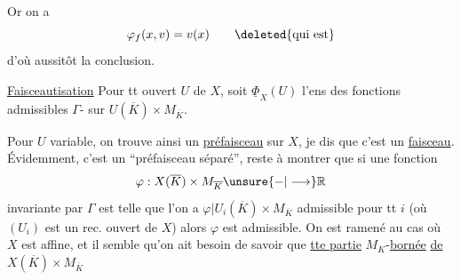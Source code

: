 Or on a
\[
\varphi_f(x,v)=v(x)\qquad\deleted{\text{qui est}}
\]
d'où aussitôt la conclusion.

\uline{Faisceautisation} Pour tt ouvert $U$ de $X$, soit $\underline{\Phi}_X(U)$ l'ens des fonctions admissibles $\Gamma$- sur $U(\overline K)\times M_{\overline K}$.

Pour $U$ variable, on trouve ainsi un \uline{préfaisceau}  sur $X$, je dis que c'est un \uline{faisceau}. Évidemment, c'est un ``préfaisceau séparé'', reste à montrer que si une fonction
\[
\varphi:X(\overline K)\times M_{\overline K}\unsure{-|\longrightarrow}\mathbb R
\]
invariante par $\Gamma$ est telle que l'on a $\varphi|U_i(\overline K)\times M_{\overline K}$ admissible pour tt $i$ (où $(U_i)$ est un rec. ouvert de $X$) alors $\varphi$ est admissible. On est ramené au cas où $X$ est affine, et il semble qu'on ait besoin de savoir que  \uline{tte partie} $M_K$-\uline{bornée} \uline{de} $X(\overline K)\times M_{\overline K}$
